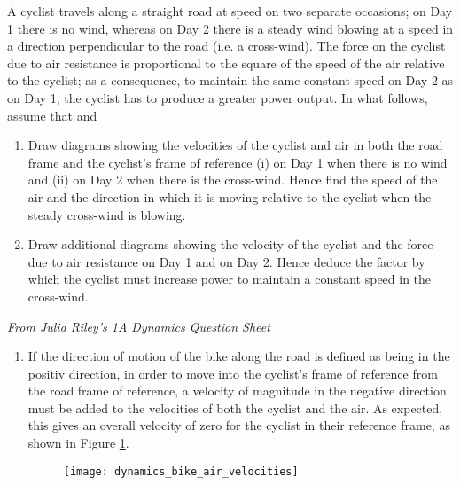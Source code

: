 
%
%
\begin{problem} %
{A cyclist travels along a straight road at speed  on two separate occasions; on Day 1 there is no wind, whereas on Day 2 there is a steady wind blowing at a speed  in a direction perpendicular to the road (i.e. a cross-wind). The force on the cyclist due to air resistance is proportional to the square of the speed of the air relative to the cyclist; as a consequence, to maintain the same constant speed  on Day 2 as on Day 1, the cyclist has to produce a greater power output. In what follows, assume that  and 
\begin{enumerate}
\item Draw diagrams showing the velocities of the cyclist and air in both the road frame and the cyclist’s frame of reference (i) on Day 1 when there is no wind and (ii) on Day 2 when there is the cross-wind. Hence find the speed of the air and the
direction in which it is moving relative to the cyclist when the steady cross-wind is blowing.
\item  Draw additional diagrams showing the velocity of the cyclist and the force due to air resistance on Day 1 and on Day 2. Hence deduce the factor by which the cyclist must increase power to maintain a constant speed in the cross-wind.
\end{enumerate}
}
{\textit{From Julia Riley's 1A Dynamics Question Sheet}}
{\begin{enumerate}
\item 
If the direction of motion of the bike along the road is defined as being in the positiv   direction, in order to move into the cyclist's frame of reference from the road frame of reference, a velocity of magnitude  in the negative  direction must be added to the velocities of both the cyclist and the air. As expected, this gives an overall velocity of zero for the cyclist in their reference frame, as shown in Figure \ref{fig:dynamics_bike_air_velocities}.

\begin{figure}[h]
\centering
\texttt{[image: dynamics\_bike\_air\_velocities]}
\caption{}
\label{fig:dynamics_bike_air_velocities}
\end{figure}


\end{enumerate}}
\end{problem}
